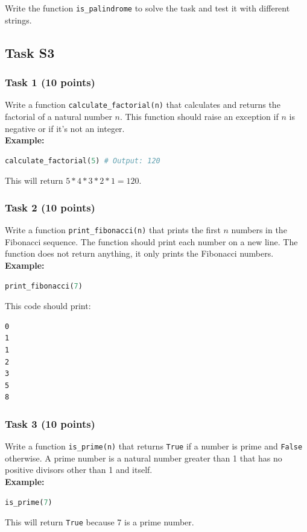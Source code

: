 \documentclass[12pt]{article}
\begin{document}
Write the function \texttt{is\_palindrome} to solve the task and test it with different strings.



\newpage
\subsection{Task S3}

\subsubsection{Task 1 (10 points)}
Write a function \texttt{calculate\_factorial(n)} that calculates and returns the factorial of a natural number $n$. This function should raise an exception if $n$ is negative or if it's not an integer. \\
\textbf{Example:}
\begin{lstlisting}[language=Python]
calculate_factorial(5) # Output: 120
\end{lstlisting}
This will return $5*4*3*2*1 = 120$.

\subsubsection{Task 2 (10 points)}
Write a function \texttt{print\_fibonacci(n)} that prints the first $n$ numbers in the Fibonacci sequence. The function should print each number on a new line. The function does not return anything, it only prints the Fibonacci numbers. \\
\textbf{Example:}
\begin{lstlisting}[language=Python]
print_fibonacci(7)
\end{lstlisting}
This code should print:
\begin{verbatim}
0
1
1
2
3
5
8
\end{verbatim}

\subsubsection{Task 3 (10 points)}
Write a function \texttt{is\_prime(n)} that returns \texttt{True} if a number is prime and \texttt{False} otherwise. A prime number is a natural number greater than 1 that has no positive divisors other than 1 and itself. \\
\textbf{Example:}
\begin{lstlisting}[language=Python]
is_prime(7)
\end{lstlisting}
This will return \texttt{True} because 7 is a prime number.
\end{document}
